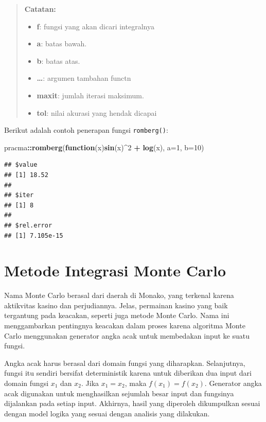 \documentclass[
]{book}
\newenvironment{Shaded}{\begin{snugshade}}{\end{snugshade}}
\newcommand{\AttributeTok}[1]{\textcolor[rgb]{0.13,0.29,0.53}{#1}}
\newcommand{\ControlFlowTok}[1]{\textcolor[rgb]{0.13,0.29,0.53}{\textbf{#1}}}
\newcommand{\DecValTok}[1]{\textcolor[rgb]{0.00,0.00,0.81}{#1}}
\newcommand{\FunctionTok}[1]{\textcolor[rgb]{0.13,0.29,0.53}{\textbf{#1}}}
\newcommand{\NormalTok}[1]{#1}
\newcommand{\SpecialCharTok}[1]{\textcolor[rgb]{0.81,0.36,0.00}{\textbf{#1}}}
\providecommand{\tightlist}{%
  \setlength{\itemsep}{0pt}\setlength{\parskip}{0pt}}
\theoremstyle{definition}
\theoremstyle{definition}
\theoremstyle{definition}
\theoremstyle{definition}
\theoremstyle{remark}
\begin{document}
\begin{quote}
\textbf{Catatan:}

\begin{itemize}
\tightlist
\item
  \textbf{f}: fungsi yang akan dicari integralnya
\item
  \textbf{a}: batas bawah.
\item
  \textbf{b}: batas atas.
\item
  \textbf{\ldots{}}: argumen tambahan functn
\item
  \textbf{maxit}: jumlah iterasi maksimum.
\item
  \textbf{tol}: nilai akurasi yang hendak dicapai
\end{itemize}
\end{quote}

Berikut adalah contoh penerapan fungsi \texttt{romberg()}:

\begin{Shaded}
\begin{Highlighting}[]
\NormalTok{pracma}\SpecialCharTok{::}\FunctionTok{romberg}\NormalTok{(}\ControlFlowTok{function}\NormalTok{(x)}\FunctionTok{sin}\NormalTok{(x)}\SpecialCharTok{\^{}}\DecValTok{2} \SpecialCharTok{+} \FunctionTok{log}\NormalTok{(x),}
        \AttributeTok{a=}\DecValTok{1}\NormalTok{, }\AttributeTok{b=}\DecValTok{10}\NormalTok{)}
\end{Highlighting}
\end{Shaded}

\begin{verbatim}
## $value
## [1] 18.52
## 
## $iter
## [1] 8
## 
## $rel.error
## [1] 7.105e-15
\end{verbatim}

\hypertarget{montecarlo}{%
\section{Metode Integrasi Monte Carlo}\label{montecarlo}}

Nama Monte Carlo berasal dari daerah di Monako, yang terkenal karena aktikvitas kasino dan perjudiannya. Jelas, permainan kasino yang baik tergantung pada keacakan, seperti juga metode Monte Carlo. Nama ini menggambarkan pentingnya keacakan dalam proses karena algoritma Monte Carlo menggunakan generator angka acak untuk membedakan input ke suatu fungsi.

Angka acak harus berasal dari domain fungsi yang diharapkan. Selanjutnya, fungsi itu sendiri bersifat deterministik karena untuk diberikan dua input dari domain fungsi \(x_1\) dan \(x_2\). Jika \(x_1 = x_2\), maka \(f \left(x_1\right) = f \left(x_2\right)\). Generator angka acak digunakan untuk menghasilkan sejumlah besar input dan fungsinya dijalankan pada setiap input. Akhirnya, hasil yang diperoleh dikumpulkan sesuai dengan model logika yang sesuai dengan analisis yang dilakukan.
\end{document}
